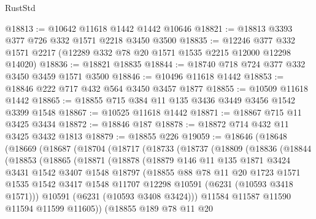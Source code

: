 \begin{lexlean}{RustStd}
\begin{coremodule}
{{@18813 := @10642 @11618 @1442 @1442 @10646
@18821 := @18813 @3393 @377 @726 @332 @1571 @2218 @3450 @3500
@18835 := @12246 @377 @332 @1571 @2217 (@12289 @332 @78 @20 @1571 @1535 @2215 @12000 @12298 @14020)
@18836 := @18821 @18835
@18844 := @18740 @718 @724 @377 @332 @3450 @3459 @1571 @3500
@18846 := @10496 @11618 @1442
@18853 := @18846 @222 @717 @432 @564 @3450 @3457 @1877
@18855 := @10509 @11618 @1442
@18865 := @18855 @715 @384 @11 @135 @3436 @3449 @3456 @1542 @3399 @1548
@18867 := @10525 @11618 @1442
@18871 := @18867 @715 @11 @3425 @3434
@18872 := @18846 @187
@18878 := @18872 @714 @432 @11 @3425 @3432 @1813
@18879 := @18855 @226
@19059 := @18646
    (@18648
      (@18669
        (@18687
          (@18704
            (@18717
              (@18733
                (@18737
                  (@18809
                    (@18836
                      (@18844
                        (@18853
                          (@18865
                            (@18871
                              (@18878
                                (@18879
                                  @146
                                  @11
                                  @135
                                  @1871
                                  @3424
                                  @3431
                                  @1542
                                  @3407
                                  @1548
                                  @18797
                                  (@18855
                                    @88
                                    @78
                                    @11
                                    @20
                                    @1723
                                    @1571
                                    @1535
                                    @1542
                                    @3417
                                    @1548
                                    @11707
                                    @12298
                                    @10591
                                    (@6231 (@10593 @3418 @1571)))
                                  @10591
                                  (@6231 (@10593 @3408 @3424)))
                                @11584
                                @11587
                                @11590
                                @11594
                                @11599
                                @11605))
                            (@18855
                              @189
                              @78
                              @11
                              @20
}}
\end{coremodule}
\end{lexlean}
